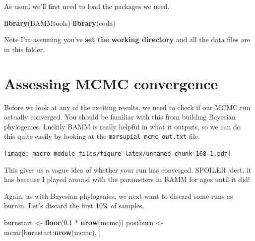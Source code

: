 \documentclass[]{book}
\newenvironment{Shaded}{\begin{snugshade}}{\end{snugshade}}
\newcommand{\KeywordTok}[1]{\textcolor[rgb]{0.13,0.29,0.53}{\textbf{{#1}}}}
\newcommand{\FloatTok}[1]{\textcolor[rgb]{0.00,0.00,0.81}{{#1}}}
\newcommand{\StringTok}[1]{\textcolor[rgb]{0.31,0.60,0.02}{{#1}}}
\newcommand{\CommentTok}[1]{\textcolor[rgb]{0.56,0.35,0.01}{\textit{{#1}}}}
\newcommand{\NormalTok}[1]{{#1}}
\theoremstyle{definition}
\theoremstyle{definition}
\theoremstyle{definition}
\theoremstyle{remark}
\begin{document}
As usual we'll first need to load the packages we need.

\begin{Shaded}
\begin{Highlighting}[]
\KeywordTok{library}\NormalTok{(BAMMtools)}
\KeywordTok{library}\NormalTok{(coda)}
\end{Highlighting}
\end{Shaded}

Note I'm assuming you've \textbf{set the working directory} and all the
data files are in this folder.

\section{Assessing MCMC convergence}\label{assessing-mcmc-convergence}

Before we look at any of the exciting results, we need to check if our
MCMC run actually converged. You should be familiar with this from
building Bayesian phylogenies. Luckily BAMM is really helpful in what it
outputs, so we can do this quite easily by looking at the
\texttt{marsupial\_mcmc\_out.txt} file.

\begin{Shaded}
\end{Shaded}

\texttt{[image: macro-module\_files/figure-latex/unnamed-chunk-168-1.pdf]}

This gives us a vague idea of whether your run has converged. SPOILER
alert, it has because I played around with the parameters in BAMM for
ages until it did!

Again, as with Bayesian phylogenies, we next want to discard some runs
as burnin. Let's discard the first 10\% of samples.

\begin{Shaded}
\begin{Highlighting}[]
\NormalTok{burnstart <-}\StringTok{ }\KeywordTok{floor}\NormalTok{(}\FloatTok{0.1} \NormalTok{*}\StringTok{ }\KeywordTok{nrow}\NormalTok{(mcmc))}
\NormalTok{postburn <-}\StringTok{ }\NormalTok{mcmc[burnstart:}\KeywordTok{nrow}\NormalTok{(mcmc), ]}
\end{Highlighting}
\end{Shaded}
\end{document}
